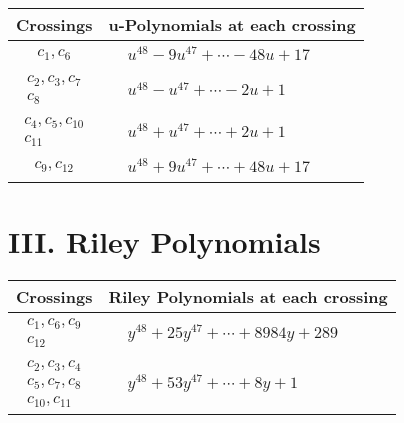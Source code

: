 \documentclass[1p]{elsarticle_modified}
\theoremstyle{definition}
\begin{document}
\begin{tabular}{m{50pt}|m{274pt}}
Crossings & \hspace{64pt}u-Polynomials at each crossing \\
\hline $$\begin{aligned}c_{1},c_{6}\end{aligned}$$&$\begin{aligned}
&u^{48}-9 u^{47}+\cdots-48 u+17
\end{aligned}$\\
\hline $$\begin{aligned}c_{2},c_{3},c_{7}\\c_{8}\end{aligned}$$&$\begin{aligned}
&u^{48}- u^{47}+\cdots-2 u+1
\end{aligned}$\\
\hline $$\begin{aligned}c_{4},c_{5},c_{10}\\c_{11}\end{aligned}$$&$\begin{aligned}
&u^{48}+u^{47}+\cdots+2 u+1
\end{aligned}$\\
\hline $$\begin{aligned}c_{9},c_{12}\end{aligned}$$&$\begin{aligned}
&u^{48}+9 u^{47}+\cdots+48 u+17
\end{aligned}$\\
\hline
\end{tabular}\newpage\renewcommand{\arraystretch}{1}
\centering \section*{ III. Riley Polynomials}
\begin{tabular}{m{50pt}|m{274pt}}
Crossings & \hspace{64pt}Riley Polynomials at each crossing \\
\hline $$\begin{aligned}c_{1},c_{6},c_{9}\\c_{12}\end{aligned}$$&$\begin{aligned}
&y^{48}+25 y^{47}+\cdots+8984 y+289
\end{aligned}$\\
\hline $$\begin{aligned}c_{2},c_{3},c_{4}\\c_{5},c_{7},c_{8}\\c_{10},c_{11}\end{aligned}$$&$\begin{aligned}
&y^{48}+53 y^{47}+\cdots+8 y+1
\end{aligned}$\\
\hline
\end{tabular}
\vskip 2pc
\end{document}
